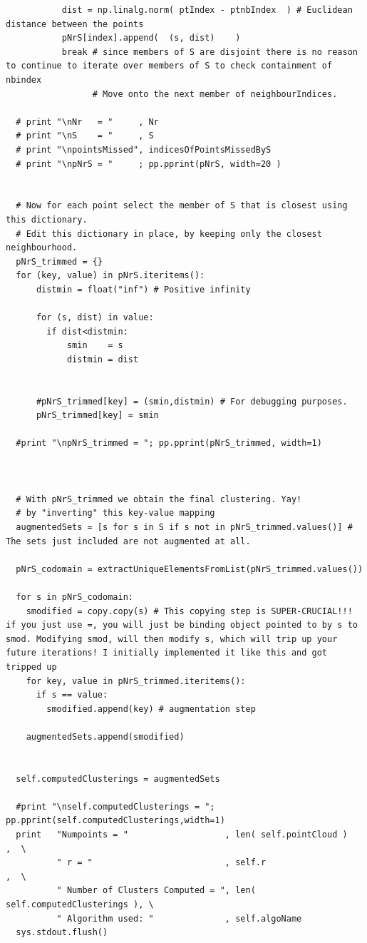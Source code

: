 \documentclass[11pt]{article}
\begin{document}
\begin{verbatim}
           dist = np.linalg.norm( ptIndex - ptnbIndex  ) # Euclidean distance between the points
           pNrS[index].append(  (s, dist)    )
           break # since members of S are disjoint there is no reason to continue to iterate over members of S to check containment of nbindex
                 # Move onto the next member of neighbourIndices. 

  # print "\nNr   = "     , Nr
  # print "\nS    = "     , S
  # print "\npointsMissed", indicesOfPointsMissedByS
  # print "\npNrS = "     ; pp.pprint(pNrS, width=20 )


  # Now for each point select the member of S that is closest using this dictionary. 
  # Edit this dictionary in place, by keeping only the closest neighbourhood. 
  pNrS_trimmed = {}
  for (key, value) in pNrS.iteritems():
      distmin = float("inf") # Positive infinity

      for (s, dist) in value:
        if dist<distmin:
            smin    = s
            distmin = dist


      #pNrS_trimmed[key] = (smin,distmin) # For debugging purposes. 
      pNrS_trimmed[key] = smin

  #print "\npNrS_trimmed = "; pp.pprint(pNrS_trimmed, width=1) 



  # With pNrS_trimmed we obtain the final clustering. Yay!
  # by "inverting" this key-value mapping
  augmentedSets = [s for s in S if s not in pNrS_trimmed.values()] # The sets just included are not augmented at all. 

  pNrS_codomain = extractUniqueElementsFromList(pNrS_trimmed.values())

  for s in pNrS_codomain:
    smodified = copy.copy(s) # This copying step is SUPER-CRUCIAL!!! if you just use =, you will just be binding object pointed to by s to smod. Modifying smod, will then modify s, which will trip up your future iterations! I initially implemented it like this and got tripped up 
    for key, value in pNrS_trimmed.iteritems():
      if s == value:
        smodified.append(key) # augmentation step

    augmentedSets.append(smodified)


  self.computedClusterings = augmentedSets

  #print "\nself.computedClusterings = "; pp.pprint(self.computedClusterings,width=1)
  print   "Numpoints = "                   , len( self.pointCloud )       ,  \
          " r = "                          , self.r                       ,  \
          " Number of Clusters Computed = ", len( self.computedClusterings ), \
          " Algorithm used: "              , self.algoName
  sys.stdout.flush()
\end{verbatim}
\end{document}
